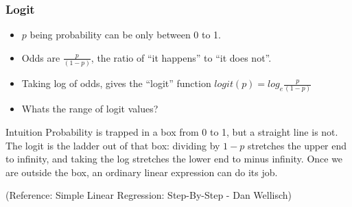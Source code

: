 





\begin{frame}[fragile]\frametitle{Logit}
\begin{itemize}
\item $p$ being probability can be only between 0 to 1.%
\item Odds are $\frac{p}{(1-p)}$, the ratio of ``it happens'' to ``it does not''.
\item Taking log of odds, gives the ``logit'' function $logit(p) = log_e \frac{p}{(1-p)}$
\item Whats the range of logit values?
\end{itemize}

\begin{block}{Intuition}
Probability is trapped in a box from 0 to 1, but a straight line is not. The logit is the ladder out of that box: dividing by $1-p$ stretches the upper end to infinity, and taking the log stretches the lower end to minus infinity. Once we are outside the box, an ordinary linear expression can do its job.
\end{block}

\tiny{(Reference: Simple Linear Regression: Step-By-Step - Dan Wellisch)}
\end{frame}


